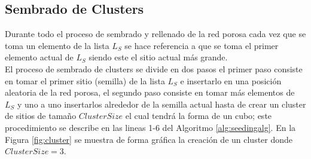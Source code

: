 

\subsection{Sembrado de Clusters}
\label{subsec:sseeding}
Durante todo el proceso de sembrado y rellenado de la red porosa cada vez que se toma un elemento de la lista $L_S$ se hace referencia a que se toma el primer elemento actual de $L_S$ siendo este el sitio actual más grande.\\

El proceso de sembrado de clusters se divide en dos pasos el primer paso consiste en tomar el primer sitio (semilla) de la lista $L_S$ e insertarlo en una posición aleatoria de la red porosa, el segundo paso consiste en tomar más elementos de $L_S$ y uno a uno insertarlos alrededor de la semilla actual hasta de crear un cluster de sitios de tamaño $ClusterSize$ el cual tendrá la forma de un cubo; este procedimiento se describe en las lineas 1-6 del Algoritmo \ref{alg:seedingalg}. En la Figura \ref{fig:cluster} se muestra de forma gráfica la creación de un cluster donde $ClusterSize=3$.\\

